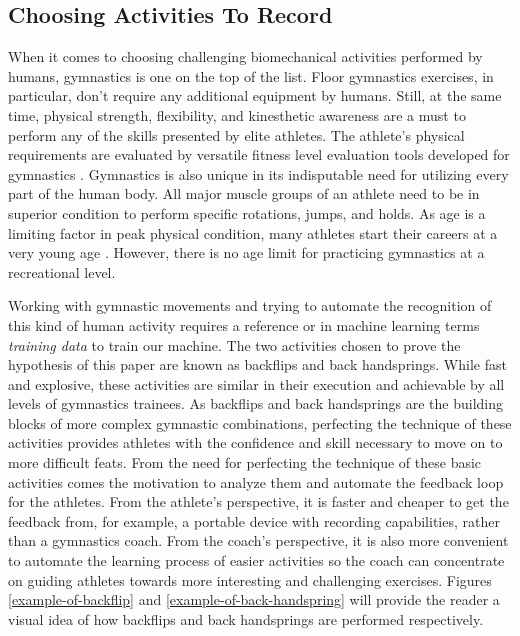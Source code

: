 \subsection{Choosing Activities To Record}

When it comes to choosing challenging biomechanical activities performed by humans, gymnastics is one on the top of the list. Floor gymnastics exercises, in particular, don't require any additional equipment by humans. Still, at the same time, physical strength, flexibility, and kinesthetic awareness are a must to perform any of the skills presented by elite athletes. The athlete's physical requirements are evaluated by versatile fitness level evaluation tools developed for gymnastics \cite{sleeper2012measuring}. Gymnastics is also unique in its indisputable need for utilizing every part of the human body. All major muscle groups of an athlete need to be in superior condition to perform specific rotations, jumps, and holds. As age is a limiting factor in peak physical condition, many athletes start their careers at a very young age \cite{artistic-vs-rhythmic-young-girls}. However, there is no age limit for practicing gymnastics at a recreational level.

Working with gymnastic movements and trying to automate the recognition of this kind of human activity requires a reference or in machine learning terms \textit{training data} to train our machine. The two activities chosen to prove the hypothesis of this paper are known as backflips and back handsprings. While fast and explosive, these activities are similar in their execution and achievable by all levels of gymnastics trainees. As backflips and back handsprings are the building blocks of more complex gymnastic combinations, perfecting the technique of these activities provides athletes with the confidence and skill necessary to move on to more difficult feats. From the need for perfecting the technique of these basic activities comes the motivation to analyze them and automate the feedback loop for the athletes. From the athlete's perspective, it is faster and cheaper to get the feedback from, for example, a portable device with recording capabilities, rather than a gymnastics coach. From the coach's perspective, it is also more convenient to automate the learning process of easier activities so the coach can concentrate on guiding athletes towards more interesting and challenging exercises. Figures \ref{example-of-backflip} and \ref{example-of-back-handspring} will provide the reader a visual idea of how backflips and back handsprings are performed respectively. 

